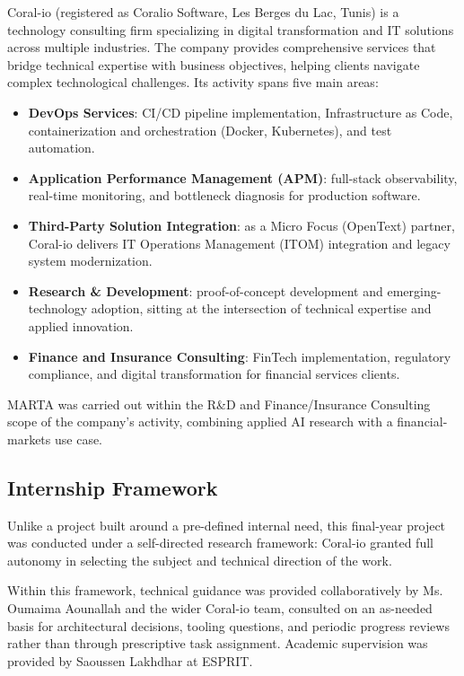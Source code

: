 Coral-io (registered as Coralio Software, Les Berges du Lac, Tunis) is a technology consulting firm specializing in digital transformation and IT solutions across multiple industries. The company provides comprehensive services that bridge technical expertise with business objectives, helping clients navigate complex technological challenges. Its activity spans five main areas:

\begin{itemize}
    \item \textbf{DevOps Services}: CI/CD pipeline implementation, Infrastructure as Code, containerization and orchestration (Docker, Kubernetes), and test automation.
    \item \textbf{Application Performance Management (APM)}: full-stack observability, real-time monitoring, and bottleneck diagnosis for production software.
    \item \textbf{Third-Party Solution Integration}: as a Micro Focus (OpenText) partner, Coral-io delivers IT Operations Management (ITOM) integration and legacy system modernization.
    \item \textbf{Research \& Development}: proof-of-concept development and emerging-technology adoption, sitting at the intersection of technical expertise and applied innovation.
    \item \textbf{Finance and Insurance Consulting}: FinTech implementation, regulatory compliance, and digital transformation for financial services clients.
\end{itemize}

MARTA was carried out within the R\&D and Finance/Insurance Consulting scope of the company's activity, combining applied AI research with a financial-markets use case.

\subsection{Internship Framework}
\label{subsec:internship-framework}

Unlike a project built around a pre-defined internal need, this final-year project was conducted under a self-directed research framework: Coral-io granted full autonomy in selecting the subject and technical direction of the work.

Within this framework, technical guidance was provided collaboratively by Ms. Oumaima Aounallah and the wider Coral-io team, consulted on an as-needed basis for architectural decisions, tooling questions, and periodic progress reviews rather than through prescriptive task assignment. Academic supervision was provided by Saoussen Lakhdhar at ESPRIT.


